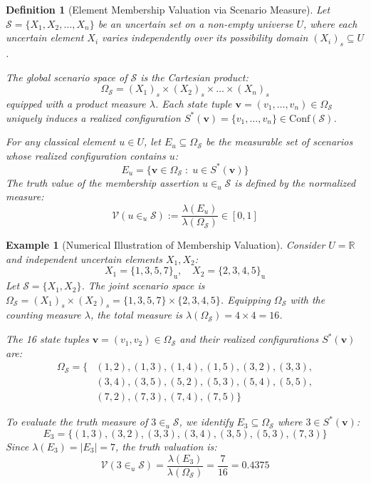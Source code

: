 \documentclass[a4paper,12pt, twoside]{memoir}
\newtheorem{definition}{Definition}[chapter]
\newtheorem{example}{Example}[chapter]
\newcommand{\tbd}[1]{\mathcal{#1}} %
\newcommand{\s}[1]{\{#1\}_\mathrm{u}} %
\begin{document}
	\begin{definition}[Element Membership Valuation via Scenario Measure]
		Let $\tbd{S} = \{X_1, X_2, \dots, X_n\}$ be an uncertain set on a non-empty universe $U$, where each uncertain element $X_i$ varies independently over its possibility domain $(X_i)_s \subseteq U$.
		
		The global scenario space of $\tbd{S}$ is the Cartesian product:
		\[
		\Omega_{\tbd{S}} = (X_1)_s \times (X_2)_s \times \dots \times (X_n)_s
		\]
		equipped with a product measure $\lambda$. Each state tuple $\mathbf{v} = (v_1, \dots, v_n) \in \Omega_{\tbd{S}}$ uniquely induces a realized configuration $S^*(\mathbf{v}) = \{v_1, \dots, v_n\} \in \mathrm{Conf}(\tbd{S})$.
		
		For any classical element $u \in U$, let $E_u \subseteq \Omega_{\tbd{S}}$ be the measurable set of scenarios whose realized configuration contains $u$:
		\[
		E_u = \{\mathbf{v} \in \Omega_{\tbd{S}} \;:\; u \in S^*(\mathbf{v})\}
		\]
		The truth value of the membership assertion $u \in_u \tbd{S}$ is defined by the normalized measure:
		\[
		\mathcal{V}(u \in_u \tbd{S}) := \frac{\lambda(E_u)}{\lambda(\Omega_{\tbd{S}})} \in [0, 1]
		\]
	\end{definition}
	
	\begin{example}[Numerical Illustration of Membership Valuation]
		Consider $U = \mathbb{R}$ and independent uncertain elements $X_1, X_2$:
		\[
		X_1 = \s{1, 3, 5, 7}, \quad X_2 = \s{2, 3, 4, 5}
		\]
		Let $\tbd{S} = \{X_1, X_2\}$. The joint scenario space is $\Omega_{\tbd{S}} = (X_1)_s \times (X_2)_s = \{1, 3, 5, 7\} \times \{2, 3, 4, 5\}$. Equipping $\Omega_{\tbd{S}}$ with the counting measure $\lambda$, the total measure is $\lambda(\Omega_{\tbd{S}}) = 4 \times 4 = 16$.
		
		The 16 state tuples $\mathbf{v} = (v_1, v_2) \in \Omega_{\tbd{S}}$ and their realized configurations $S^*(\mathbf{v})$ are:
		\begin{align*}
			\Omega_{\tbd{S}} = \{ & (1,2), (1,3), (1,4), (1,5), (3,2), (3,3), \\
			& (3,4), (3,5), (5,2), (5,3), (5,4), (5,5), \\
			& (7,2), (7,3), (7,4), (7,5) \}
		\end{align*}
		
		To evaluate the truth measure of $3 \in_u \tbd{S}$, we identify $E_3 \subseteq \Omega_{\tbd{S}}$ where $3 \in S^*(\mathbf{v})$:
		\[
		E_3 = \{(1,3), (3,2), (3,3), (3,4), (3,5), (5,3), (7,3)\}
		\]
		Since $\lambda(E_3) = |E_3| = 7$, the truth valuation is:
		\[
		\mathcal{V}(3 \in_u \tbd{S}) = \frac{\lambda(E_3)}{\lambda(\Omega_{\tbd{S}})} = \frac{7}{16} = 0.4375
		\]
	\end{example}
	
\end{document}
